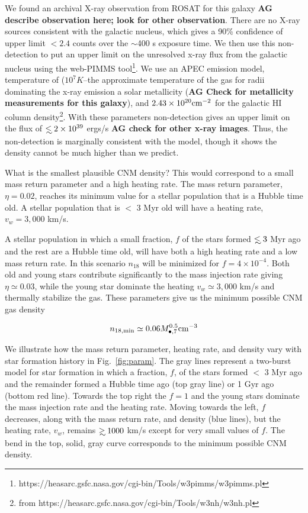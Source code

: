 \documentclass[usenatbib,fleqn]{mn2e}
\newcommand\lsim{\mathrel{\rlap{\lower4pt\hbox{\hskip1pt$\sim$}}
    \raise1pt\hbox{$<$}}}
\newcommand\gsim{\mathrel{\rlap{\lower4pt\hbox{\hskip1pt$\sim$}}
    \raise1pt\hbox{$>$}}}
\newcommand{\Mbh}[1][]{M_{\bullet#1}}
\begin{document}
We found an archival X-ray observation from ROSAT for this galaxy {\bf
  AG describe observation here; look for other observation}. There are
no X-ray sources consistent with the galactic nucleus, which gives a
90\% confidence of upper limit $<2.4$ counts over the $\sim$400 s
exposure time. We then use this non-detection to put an upper limit on
the unresolved x-ray flux from the galactic nucleus using the
web-PIMMS
tool\footnote{https://heasarc.gsfc.nasa.gov/cgi-bin/Tools/w3pimms/w3pimms.pl}. We
use an APEC emission model, temperature of ($10^{7} K$--the
approximate temperature of the gas for radii dominating the x-ray
emission a solar metallicity ({\bf AG Check for metallicity
  measurements for this galaxy}), and $2.43\times 10^{20} {\rm cm^{-2}}$ for
the galactic HI column density\footnote{from https://heasarc.gsfc.nasa.gov/cgi-bin/Tools/w3nh/w3nh.pl}. With
these parameters non-detection gives an upper limit on the flux of
$\lsim 2\times 10^{39}$ ergs/s {\bf AG check for other x-ray
  images}. Thus, the non-detection is marginally consistent with the
model, though it shows the density cannot be much higher than we
predict.

What is the smallest plausible CNM density? This would correspond to a
small mass return parameter and a high heating rate. The mass return
parameter, $\eta=0.02$, reaches its minimum value for a stellar
population that is a Hubble time old. A stellar population
that is $<$ 3 Myr old will have a heating rate, $v_w=3,000$ km/s.

A stellar population in which a small fraction, $f$ of the stars
formed $\lsim 3$ Myr ago and the rest are a Hubble time old, will have
both a high heating rate and a low mass return rate. In this scenario
$n_{18}$ will be minimized for $f=4\times 10^{-4}$. Both old and young
stars contribute significantly to the mass injection rate giving
$\eta\simeq 0.03$, while the young star dominate the heating
$v_w\simeq 3,000$ km/s and thermally stabilize the gas. These
parameters give us the minimum possible CNM gas density

\begin{equation}
n_{\rm 18,min}\simeq 0.06 \Mbh[,7]^{0.5} {\rm cm^{-3}}
\label{eq:n18min}
\end{equation}

We illustrate how the mass return parameter, heating rate, and
density vary with star formation history in Fig.~\ref{fig:param}. The
gray lines represent a two-burst model for star formation in which a
fraction, $f$, of the stars formed $<$ 3 Myr ago and the remainder
formed a Hubble time ago (top gray line) or 1 Gyr ago (bottom red
line).  Towards the top right the $f=1$ and the young stars dominate
the mass injection rate and the heating rate.  Moving towards the
left, $f$ decreases, along with the mass return rate, and density
(blue lines), but the heating rate, $v_w$, remains $\gsim 1000$ km/s
except for very small values of $f$. The bend in the top, solid, gray curve
corresponds to the minimum possible CNM density.
\end{document}
